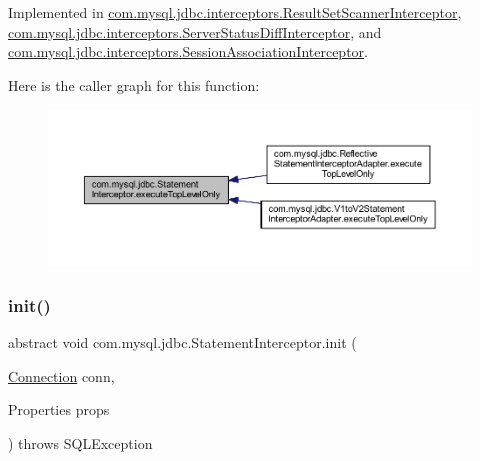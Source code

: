 Implemented in \mbox{\hyperlink{classcom_1_1mysql_1_1jdbc_1_1interceptors_1_1_result_set_scanner_interceptor_ac0eab5cd93339b4cabf0ed35167f8e55}{com.\+mysql.\+jdbc.\+interceptors.\+Result\+Set\+Scanner\+Interceptor}}, \mbox{\hyperlink{classcom_1_1mysql_1_1jdbc_1_1interceptors_1_1_server_status_diff_interceptor_a3e6b3e52ee87900cec14f20f1b96cdfe}{com.\+mysql.\+jdbc.\+interceptors.\+Server\+Status\+Diff\+Interceptor}}, and \mbox{\hyperlink{classcom_1_1mysql_1_1jdbc_1_1interceptors_1_1_session_association_interceptor_ad6d29d0b26ce2453c949e2cdffa8be49}{com.\+mysql.\+jdbc.\+interceptors.\+Session\+Association\+Interceptor}}.

Here is the caller graph for this function\+:
\nopagebreak
\begin{figure}[H]
\begin{center}
\leavevmode
\includegraphics[width=350pt]{interfacecom_1_1mysql_1_1jdbc_1_1_statement_interceptor_a445950e1035a2519be9d5fbaf1fe1b8c_icgraph}
\end{center}
\end{figure}
\mbox{\label{interfacecom_1_1mysql_1_1jdbc_1_1_statement_interceptor_a985c3d5d0c9b9694cfb73ba92273409e}} 
\subsubsection{\texorpdfstring{init()}{init()}}
{\footnotesize\ttfamily abstract void com.\+mysql.\+jdbc.\+Statement\+Interceptor.\+init (\begin{DoxyParamCaption}\item[{\mbox{\hyperlink{interfacecom_1_1mysql_1_1jdbc_1_1_connection}{Connection}}}]{conn,  }\item[{Properties}]{props }\end{DoxyParamCaption}) throws S\+Q\+L\+Exception\hspace{0.3cm}{\ttfamily [abstract]}}


